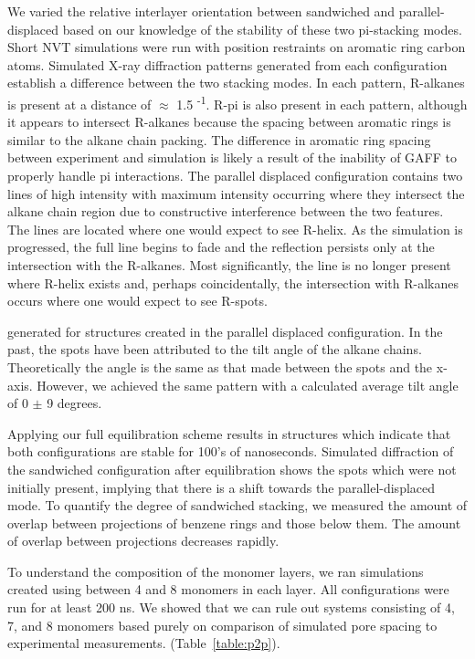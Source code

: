 We varied the relative interlayer orientation between sandwiched and 
parallel-displaced based on our knowledge of the stability of these two
pi-stacking modes. Short NVT simulations were run with position restraints
on aromatic ring carbon atoms. Simulated X-ray diffraction patterns 
generated from each configuration establish a difference between the two
stacking modes. In each pattern, R-alkanes is present at a distance of
$\approx$ 1.5 \angstrom \textsuperscript{-1}. R-pi is also present in each 
pattern, although it appears to intersect R-alkanes because the spacing
between aromatic rings is similar to the alkane chain packing. The difference 
in aromatic ring spacing between experiment and simulation is likely a result
of the inability of GAFF to properly handle pi interactions. The parallel
displaced configuration contains two lines of high intensity with maximum
intensity occurring where they intersect the alkane chain region due to
constructive interference between the two features. The lines are located
where one would expect to see R-helix. As the simulation is progressed, 
the full line begins to fade and the reflection persists only at the 
intersection with the R-alkanes. Most significantly, the line is no
longer present where R-helix exists and, perhaps coincidentally, the 
intersection with R-alkanes occurs where one would expect to see R-spots.

generated for structures created in the parallel displaced configuration.
In the past, the spots have been attributed to the tilt angle of the 
alkane chains. Theoretically the angle is the same as that made between 
the spots and the x-axis. However, we achieved the same pattern with 
a calculated average tilt angle of 0 $\pm$ 9 degrees. %

Applying our full equilibration scheme results in structures which indicate
that both configurations are stable for 100's of nanoseconds. Simulated 
diffraction of the sandwiched configuration after equilibration shows the spots which were not initially
present, implying that there is a shift towards the parallel-displaced
mode. To quantify the degree of sandwiched stacking, we measured the 
amount of overlap between projections of benzene rings and those below
them. The amount of overlap between projections decreases rapidly. %
	
To understand the composition of the monomer layers, we ran simulations
created using between 4 and 8 monomers in each layer. All configurations 
were run for at least 200 ns. We showed that we can rule out systems 
consisting of 4, 7, and 8 monomers based purely on comparison of 
simulated pore spacing to experimental measurements.
(Table~\ref{table:p2p}). 
        
